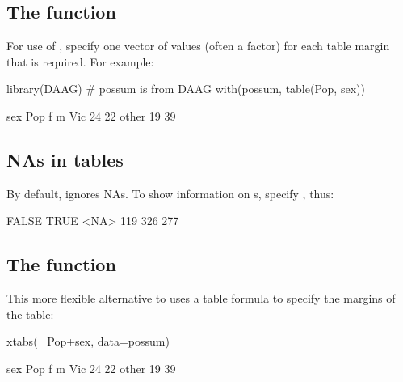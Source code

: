 \subsection*{The  function}\label{ss:table}
For use of , specify one vector of values (often a
factor) for each table margin that is required.  For example:
\begin{Schunk}
\begin{Sinput}
library(DAAG)        # possum is from DAAG
with(possum, table(Pop, sex))
\end{Sinput}
\begin{Soutput}
       sex
Pop      f  m
  Vic   24 22
  other 19 39
\end{Soutput}
\end{Schunk}

\subsection*{NAs in tables}

By default,  ignores NAs. To show information on
s, specify , thus:
\begin{Schunk}
\begin{Soutput}

FALSE  TRUE  <NA> 
  119   326   277 
\end{Soutput}
\end{Schunk}


\subsection*{The  function}
This more flexible alternative to  uses a table
formula to specify the margins of the table:
\begin{Schunk}
\begin{Sinput}
xtabs(~ Pop+sex, data=possum)
\end{Sinput}
\begin{Soutput}
       sex
Pop      f  m
  Vic   24 22
  other 19 39
\end{Soutput}
\end{Schunk}

